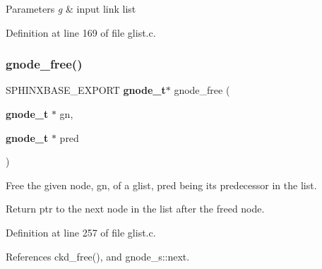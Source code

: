 \begin{DoxyParams}{Parameters}
{\em g} & input link list \\
\hline
\end{DoxyParams}


Definition at line 169 of file glist.\+c.

\mbox{\label{glist_8h_a68b51aea4de463b284a19668a713d502}} 
\subsubsection{gnode\+\_\+free()}
{\footnotesize\ttfamily S\+P\+H\+I\+N\+X\+B\+A\+S\+E\+\_\+\+E\+X\+P\+O\+RT \textbf{ gnode\+\_\+t}$\ast$ gnode\+\_\+free (\begin{DoxyParamCaption}\item[{\textbf{ gnode\+\_\+t} $\ast$}]{gn,  }\item[{\textbf{ gnode\+\_\+t} $\ast$}]{pred }\end{DoxyParamCaption})}



Free the given node, gn, of a glist, pred being its predecessor in the list. 

Return ptr to the next node in the list after the freed node. 

Definition at line 257 of file glist.\+c.



References ckd\+\_\+free(), and gnode\+\_\+s\+::next.

